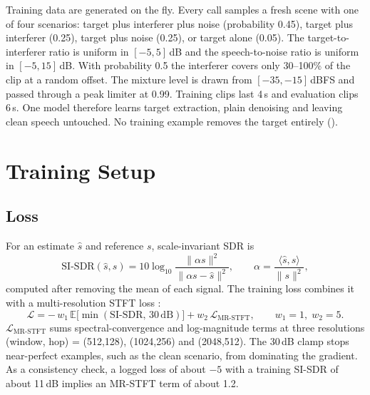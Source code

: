 \documentclass[11pt,a4paper]{article}
\newcommand{\sisdr}{SI-SDR}
\begin{document}
Training data are generated on the fly. Every call samples a fresh scene with one of four
scenarios: target plus interferer plus noise (probability 0.45), target plus interferer (0.25),
target plus noise (0.25), or target alone (0.05). The target-to-interferer ratio is uniform in
$[-5,5]$\,dB and the speech-to-noise ratio is uniform in $[-5,15]$\,dB. With probability 0.5 the
interferer covers only 30--100\% of the clip at a random offset. The mixture level is drawn from
$[-35,-15]$\,dBFS and passed through a peak limiter at 0.99. Training clips last 4\,s and
evaluation clips 6\,s. One model therefore learns target extraction, plain denoising and leaving
clean speech untouched. No training example removes the target entirely ().

\section{Training Setup}
\label{sec:training}

\subsection{Loss}
For an estimate $\hat{s}$ and reference $s$, scale-invariant SDR \cite{leroux2019sdr} is
\begin{equation}
 \mathrm{SI\text{-}SDR}(\hat{s},s)=10\log_{10}\frac{\|\alpha s\|^2}{\|\alpha s-\hat{s}\|^2},
 \qquad \alpha=\frac{\langle\hat{s},s\rangle}{\|s\|^2},
\end{equation}
computed after removing the mean of each signal. The training loss combines it with a
multi-resolution STFT loss \cite{yamamoto2020pwg}:
\begin{equation}
 \mathcal{L}= -\,w_1\,\mathbb{E}\big[\min(\mathrm{SI\text{-}SDR},\,30\,\mathrm{dB})\big]
 + w_2\,\mathcal{L}_{\text{MR-STFT}},\qquad w_1=1,\; w_2=5 .
\end{equation}
$\mathcal{L}_{\text{MR-STFT}}$ sums spectral-convergence and log-magnitude terms at three
resolutions (window, hop) = (512,128), (1024,256) and (2048,512). The 30\,dB clamp stops
near-perfect examples, such as the clean scenario, from dominating the gradient. As a consistency
check, a logged loss of about $-5$ with a training \sisdr{} of about 11\,dB implies an MR-STFT term
of about 1.2.
\end{document}
